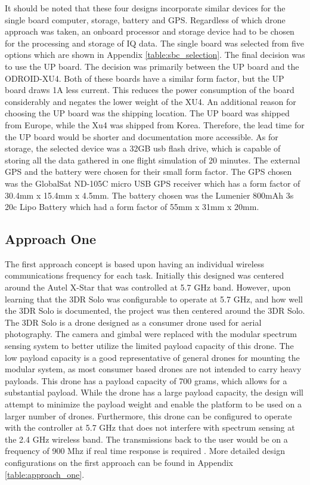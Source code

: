 It should be noted that these four designs incorporate similar devices for the single board computer, storage, battery and GPS. Regardless of which drone approach was taken, an onboard processor and storage device had to be chosen for the processing and storage of IQ data. The single board was selected from five options which are shown in Appendix \ref{table:sbc_selection}. The final decision was to use the UP board. The decision was primarily between the UP board and the ODROID-XU4. Both of these boards have a similar form factor, but the UP board draws 1A less current. This reduces the power consumption of the board considerably and negates the lower weight of the XU4. An additional reason for choosing the UP board was the shipping location. The UP board was shipped from Europe, while the Xu4 was shipped from Korea. Therefore, the lead time for the UP board would be shorter and documentation more accessible. As for storage, the selected device was a 32GB usb flash drive, which is capable of storing all the data gathered in one flight simulation of 20 minutes. %
The external GPS and the battery were chosen for their small form factor. The GPS chosen was the GlobalSat ND-105C micro USB GPS receiver which has a form factor of 30.4mm x 15.4mm x 4.5mm. The battery chosen was the Lumenier 800mAh 3s 20c Lipo Battery which had a form factor of 55mm x 31mm x 20mm.

\subsection{Approach One}
The first approach concept is based upon having an individual wireless communications frequency for each task. Initially this designed was centered around the Autel X-Star that was controlled at 5.7 GHz band. However, upon learning that the 3DR Solo was configurable to operate at 5.7 GHz, and how well the 3DR Solo is documented, the project was then centered around the 3DR Solo. The 3DR Solo is a drone designed as a consumer drone used for aerial photography. The camera and gimbal were replaced with the modular spectrum sensing system to better utilize the limited payload capacity of this drone. The low payload capacity is a good representative of general drones for mounting the modular system, as most consumer based drones are not intended to carry heavy payloads. This drone has a payload capacity of 700 grams, which allows for a substantial payload. While the drone has a large payload capacity, the design will attempt to minimize the payload weight and enable the platform to be used on a larger number of drones. Furthermore, this drone can be configured to operate with the controller at 5.7 GHz that does not interfere with spectrum sensing at the 2.4 GHz wireless band. The transmissions back to the user would be on a frequency of 900 Mhz if real time response is required \cite{3dr_Website}. More detailed design configurations on the first approach can be found in Appendix \ref{table:approach_one}.

